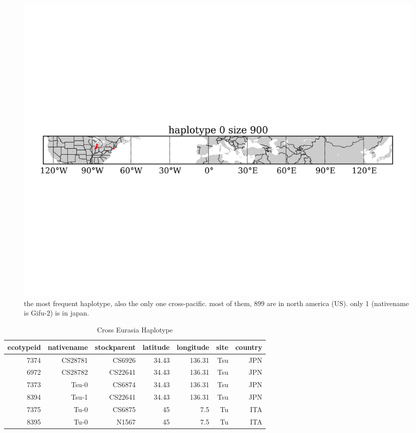 \documentclass[a4paper,10pt]{article}
\begin{document}
\begin{figure}
\includegraphics[angle=-90,width=1\textwidth]{figures/haplotype_0_size900_map_site_network.png}
\caption{the most frequent haplotype, also the only one cross-pacific. most of them, 899 are in north america (US). only 1 (nativename is Gifu-2) is in japan.}\label{fhap_2}
\end{figure}

\begin{table}
\caption{Cross Eurasia Haplotype}
\begin{tabular}{|r|r|r|r|r|r|r|}
\hline
ecotypeid & nativename & stockparent & latitude & longitude & site & country\\
\hline
7374 & CS28781    & CS6926      &    34.43 &    136.31 & Tsu  & JPN  \\
6972 & CS28782    & CS22641     &    34.43 &    136.31 & Tsu  & JPN  \\
7373 & Tsu-0      & CS6874      &    34.43 &    136.31 & Tsu  & JPN  \\
8394 & Tsu-1      & CS22641     &    34.43 &    136.31 & Tsu  & JPN  \\
7375 & Tu-0       & CS6875      &       45 &       7.5 & Tu   & ITA  \\
8395 & Tu-0       & N1567       &       45 &       7.5 & Tu   & ITA  \\
\hline
\end{tabular}
\label{thap_1}
\end{table}
\end{document}
